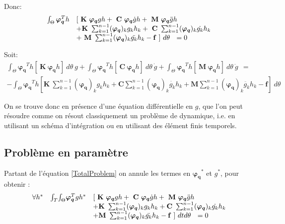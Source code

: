 \documentclass[12pt,a4paper]{report}
\begin{document}
Donc:
\begin{equation}
\begin{array}{r l}
	\int_\Theta	\boldsymbol{\varphi_q}^Th &
				[  ~\mathbf{K}~ \boldsymbol{\varphi_q}gh
				+ ~\mathbf{C}~ \boldsymbol{\varphi_q}  \dot{g}h 
				+ ~\mathbf{M}~ \boldsymbol{\varphi_q} \ddot{g}h 
	\\ &
			+ \mathbf{K}~ \sum_{k=1}^{n-1} (\boldsymbol{\varphi_q})_k       g_k  h_k 
			+ ~\mathbf{C}~ \sum_{k=1}^{n-1} (\boldsymbol{\varphi_q})_k  \dot{g_k} h_k 
	\\ &
			+ ~\mathbf{M}~ \sum_{k=1}^{n-1} (\boldsymbol{\varphi_q})_k \ddot{g_k} h_k
			-\mathbf{f}~] ~d\theta ~~=0
\end{array}
\end{equation}

Soit:
\begin{equation}
\begin{array}{l}
	\displaystyle
		\int_\Theta	\!
			\boldsymbol{\varphi_q}^Th [    ~\mathbf{K}~ \boldsymbol{\varphi_q}h ] ~d\theta
	~g
	+ \!
		\int_\Theta	\!
			\boldsymbol{\varphi_q}^Th [ ~\mathbf{C}~ \boldsymbol{\varphi_q}h ] ~d\theta
	  ~\dot{g}
	+ \!
		\int_\Theta	\!
			\boldsymbol{\varphi_q}^Th [ ~\mathbf{M}~ \boldsymbol{\varphi_q}h ] ~d\theta
	  ~\ddot{g}
	  ~~ =
	\\
	- \! \displaystyle
		\int_\Theta		
			\boldsymbol{\varphi_q}^Th [  \mathbf{K}~ \sum_{k=1}^{n-1} (\boldsymbol{\varphi_q})_k       g_k  h_k 
				+ \mathbf{C} \sum_{k=1}^{n-1} (\boldsymbol{\varphi_q})_k  \dot{g_k} h_k 
				+ \mathbf{M} \sum_{k=1}^{n-1} (\boldsymbol{\varphi_q})_k \ddot{g_k} h_k
				- \mathbf{f} ] ~d\theta
\end{array}
\end{equation}

On se trouve donc en présence d'une équation différentielle en $g$, que l'on peut résoudre comme on résout classiquement un problème de dynamique, i.e. en utilisant un schéma d'intégration ou en utilisant des élément finis temporels.

\subsection{Problème en paramètre}

Partant de l'équation \ref{TotalProblem} on annule les termes en $\boldsymbol{\varphi_q}^*$ et $g^*$, pour obtenir :
  \begin{equation}
\begin{array}{r r l}
	\forall h^*
	&\int_T \! \int_\Theta \!  \boldsymbol{\varphi_q}^Tgh^* &
						[  ~\mathbf{K}~ \boldsymbol{\varphi_q}gh
						+ ~\mathbf{C}~ \boldsymbol{\varphi_q} \dot{g}h 
						+ ~\mathbf{M}~ \boldsymbol{\varphi_q} \ddot{g}h
	\\ &&
	  		+ \mathbf{K}~ \sum_{k=1}^{n-1} (\boldsymbol{\varphi_q})_k       g_k  h_k 
			+ \mathbf{C}~ \sum_{k=1}^{n-1} (\boldsymbol{\varphi_q})_k  \dot{g_k} h_k 
	\\ &&
			+ \mathbf{M}~ \sum_{k=1}^{n-1} (\boldsymbol{\varphi_q})_k \ddot{g_k} h_k
			-\mathbf{f}~] ~dt d\theta ~~=0
\end{array}
\end{equation}
\end{document}
